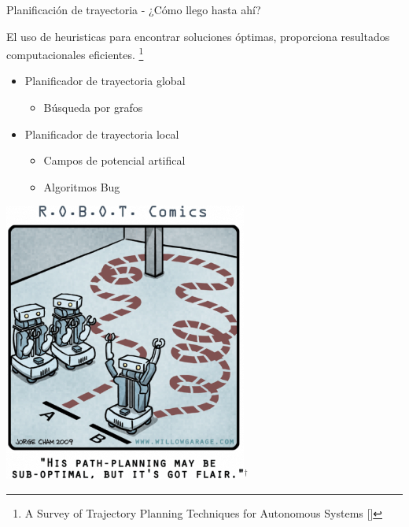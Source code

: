 \documentclass[
  24pt, %
  aspectratio=169, %
]{beamer}
\begin{document}
\begin{frame}{Planificación de trayectoria - ¿Cómo llego hasta ahí?}
  \begin{minipage}{0.57\textwidth}

    El uso de heuristicas para encontrar soluciones óptimas, proporciona resultados computacionales eficientes. \footnote{A Survey of Trajectory Planning Techniques for Autonomous Systems [\cite{Mir2022}]} 
    \bigskip %
    \begin{itemize}
    \item Planificador de trayectoria global
      \begin{itemize}
      \item Búsqueda por grafos
      \end{itemize}
      \bigskip %
    \item Planificador de trayectoria local
      \begin{itemize}
      \item Campos de potencial artifical
      \item Algoritmos Bug
      \end{itemize}
    \end{itemize}
    \bigskip %
  \end{minipage}
  \hspace{0.2cm}
  \begin{minipage}{0.4\textwidth}
    \includegraphics[width=0.6\textwidth]{img5}$^\dag$\\
  \end{minipage}
\end{frame}

  
\end{document}
